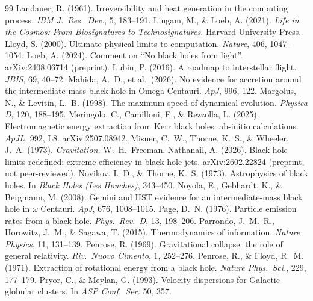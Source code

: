 \documentclass[11pt]{article}
\begin{document}
\begin{thebibliography}{99}
 Landauer, R. (1961). Irreversibility and heat generation in the computing process. \emph{IBM J.\ Res.\ Dev.}, 5, 183--191.
 Lingam, M., \& Loeb, A. (2021). \emph{Life in the Cosmos: From Biosignatures to Technosignatures.} Harvard University Press.
 Lloyd, S. (2000). Ultimate physical limits to computation. \emph{Nature}, 406, 1047--1054.
 Loeb, A. (2024). Comment on ``No black holes from light''. arXiv:2408.06714 (preprint).
 Lubin, P. (2016). A roadmap to interstellar flight. \emph{JBIS}, 69, 40--72.
 Mahida, A.~D., et al.\ (2026). No evidence for accretion around the intermediate-mass black hole in Omega Centauri. \emph{ApJ}, 996, 122.
 Margolus, N., \& Levitin, L.~B. (1998). The maximum speed of dynamical evolution. \emph{Physica D}, 120, 188--195.
 Meringolo, C., Camilloni, F., \& Rezzolla, L. (2025). Electromagnetic energy extraction from Kerr black holes: ab-initio calculations. \emph{ApJL}, 992, L8. arXiv:2507.08942.
 Misner, C.~W., Thorne, K.~S., \& Wheeler, J.~A. (1973). \emph{Gravitation.} W.~H.\ Freeman.
 Nathanail, A. (2026). Black hole limits redefined: extreme efficiency in black hole jets. arXiv:2602.22824 (preprint, not peer-reviewed).
 Novikov, I.~D., \& Thorne, K.~S. (1973). Astrophysics of black holes. In \emph{Black Holes (Les Houches)}, 343--450.
 Noyola, E., Gebhardt, K., \& Bergmann, M. (2008). Gemini and HST evidence for an intermediate-mass black hole in $\omega$ Centauri. \emph{ApJ}, 676, 1008--1015.
 Page, D.~N. (1976). Particle emission rates from a black hole. \emph{Phys.\ Rev.\ D}, 13, 198--206.
 Parrondo, J.~M.~R., Horowitz, J.~M., \& Sagawa, T. (2015). Thermodynamics of information. \emph{Nature Physics}, 11, 131--139.
 Penrose, R. (1969). Gravitational collapse: the role of general relativity. \emph{Riv.\ Nuovo Cimento}, 1, 252--276.
 Penrose, R., \& Floyd, R.~M. (1971). Extraction of rotational energy from a black hole. \emph{Nature Phys.\ Sci.}, 229, 177--179.
 Pryor, C., \& Meylan, G. (1993). Velocity dispersions for Galactic globular clusters. In \emph{ASP Conf.\ Ser.} 50, 357.

\end{thebibliography}
\end{document}
